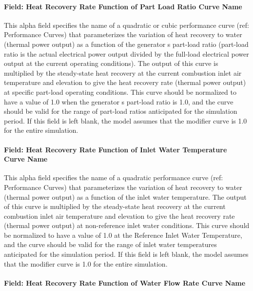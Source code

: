 \paragraph{Field: Heat Recovery Rate Function of Part Load Ratio Curve Name}\label{field-heat-recovery-rate-function-of-part-load-ratio-curve-name}

This alpha field specifies the name of a quadratic or cubic performance curve (ref: Performance Curves) that parameterizes the variation of heat recovery to water (thermal power output) as a function of the generator s part-load ratio (part-load ratio is the actual electrical power output divided by the full-load electrical power output at the current operating conditions). The output of this curve is multiplied by the steady-state heat recovery at the current combustion inlet air temperature and elevation to give the heat recovery rate (thermal power output) at specific part-load operating conditions. This curve should be normalized to have a value of 1.0 when the generator s part-load ratio is 1.0, and the curve should be valid for the range of part-load ratios anticipated for the simulation period. If this field is left blank, the model assumes that the modifier curve is 1.0 for the entire simulation.

\paragraph{Field: Heat Recovery Rate Function of Inlet Water Temperature Curve Name}\label{field-heat-recovery-rate-function-of-inlet-water-temperature-curve-name}

This alpha field specifies the name of a quadratic performance curve (ref: Performance Curves) that parameterizes the variation of heat recovery to water (thermal power output) as a function of the inlet water temperature. The output of this curve is multiplied by the steady-state heat recovery at the current combustion inlet air temperature and elevation to give the heat recovery rate (thermal power output) at non-reference inlet water conditions. This curve should be normalized to have a value of 1.0 at the Reference Inlet Water Temperature, and the curve should be valid for the range of inlet water temperatures anticipated for the simulation period. If this field is left blank, the model assumes that the modifier curve is 1.0 for the entire simulation.

\paragraph{Field: Heat Recovery Rate Function of Water Flow Rate Curve Name}\label{field-heat-recovery-rate-function-of-water-flow-rate-curve-name}

